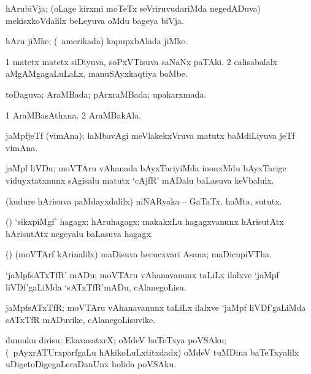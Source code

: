 \bentry
{}
\gl{\nA}
\bmng
hArubiVja; (oLage kirxmi moTeTx seVriruvudariMda negedADuva) mekisxkoVdalilx beLeyuva oMdu bageya biVja. 
\emng
\eentry

\bentry
{}
\gl{\nA}
\bmng
hAru jiMke; (\kanu\ amerikada) kapupxbAlada jiMke. 
\emng
\eentry

\bentry
{}
\gl{\nA}
\bmng
\bnum
\num{1} matetx matetx siDiyuva, soPxVTisuva saNaNx paTAki. 
\num{2} calisabalalx aMgAMgagaLuLaLx, manuSAyxkaqtiya boMbe. 
\enum
\emng
\eentry

\bentry
{}
\gl{\gu}
\bmng
toDaguva; AraMBada; pArxraMBada; upakarxmada. 
\emng

\noindent
\gl{\pagu}
\bmng
\bnum
\num{1}  AraMBasAthxna. 
\num{2}  AraMBakAla. 
\enum
\emng
\eentry

\bentry
{}
\gl{\nA}
\bmng
jaMpfjeTf (vimAna); laMbavAgi meVlakekxVruva matutx baMdiLiyuva jeTf vimAna. 
\emng
\eentry

\bentry
{}
\gl{\nA}
\bmng
jaMpf liVDu; moVTAru vAhanada bAyxTariyiMda inonxMdu bAyxTarige viduyxtatxnunx sAgisalu matutx `cAjfR' mADalu baLasuva keVbalulx. 
\emng
\eentry

\bentry
{}
\gl{\nA}
\bmng
(kudure hArisuva paMdayxdalilx) niNARyaka -- GaTaTx, haMta, sututx. 
\emng
\eentry

\bentry
{}
\gl{\nA}
\bmng
(\ame) `sikxpiMgf' hagagx; hAruhagagx; makakxLu hagagxvanunx hArisutAtx hArisutAtx negeyalu baLasuva hagagx. 
\emng
\eentry

\bentry
{}
\gl{\nA}
\bmng
(\ame) (moVTArf kArinalilx) maDisuva hecucxvari Asana; maDicupiVTha. 
\emng
\eentry

\bentry
{}
\gl{\sakirx}
\bmng
`jaMpfsATxTfR' mADu; moVTAru vAhanavanunx taLiLx ilalxve `jaMpf liVDf'gaLiMda `sATxTfR'mADu, cAlanegoLisu. 
\emng
\eentry

\bentry
{}
\gl{\nA}
\bmng
jaMpfsATxTfR; moVTAru vAhanavanunx taLiLx ilalxve `jaMpf liVDf'gaLiMda sATxTfR mADuvike, cAlanegoLisuvike. 
\emng
\eentry


\bentry
{}
\gl{\nA}
\bmng
dumuku dirisu; EkavasatxrX; oMdeV baTeTxya poVSAku; (\sA\ pAyxrATUrxparfgaLu hAkikoLuLxtitxdadx) oMdeV tuMDina baTeTxyalilx uDigetoDigegaLeraDanUnx holida poVSAku. 
\emng
\eentry

